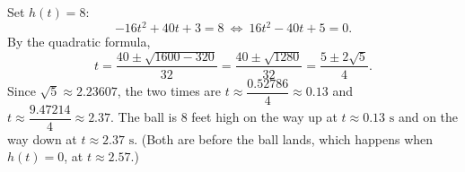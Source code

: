 Set $h(t)=8$:
\[
-16t^2+40t+3=8\ \Longleftrightarrow\ 16t^2-40t+5=0 .
\]
By the quadratic formula,
\[
t=\dfrac{40\pm\sqrt{1600-320}}{32}=\dfrac{40\pm\sqrt{1280}}{32}=\dfrac{5\pm2\sqrt5}{4}.
\]
Since $\sqrt5\approx2.23607$, the two times are $t\approx\dfrac{0.52786}{4}\approx0.13$ and $t\approx\dfrac{9.47214}{4}\approx2.37$. The ball is $8$ feet high on the way up at $\boxed{t\approx0.13\text{ s}}$ and on the way down at $\boxed{t\approx2.37\text{ s}}$. (Both are before the ball lands, which happens when $h(t)=0$, at $t\approx2.57$.)
